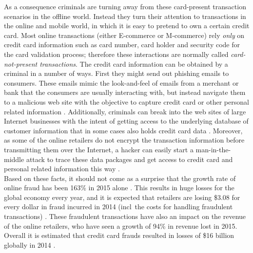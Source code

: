 As a consequence criminals are turning away from these card-present transaction scenarios in the offline world. Instead they turn their attention to transactions in the online and mobile world, in which it is easy to pretend to own a certain credit card. Most online transactions (either \gls{E-commerce} or \gls{M-commerce}) rely \emph{only} on credit card information such as card number, card holder and security code for the card validation process; therefore these interactions are normally called \emph{card-not-present transactions}. The credit card information can be obtained by a criminal in a number of ways. First they might send out phishing emails to consumers. These emails mimic the look-and-feel of emails from a merchant or bank that the consumers are usually interacting with, but instead navigate them to a malicious web site with the objective to capture credit card or other personal related information \citep{ConsumerAction2009}. Additionally, criminals can break into the web sites of large Internet businesses with the intent of getting access to the underlying database of customer information that in some cases also holds credit card data \citep{Holmes2015}. Moreover, as some of the online retailers do not encrypt the transaction information before transmitting them over the Internet, a hacker can easily start a man-in-the-middle attack to trace these data packages and get access to credit card and personal related information this way \citep{Captain2015}. \\

Based on these facts, it should not come as a surprise that the growth rate of online fraud has been 163\% in 2015 alone \citep{PYMNTS2016}. This results in huge losses for the global economy every year, and it is expected that retailers are losing \$3.08 for every dollar in fraud incurred in 2014 (\gls{incl}\ the costs for handling fraudulent transactions) \citep{Rampton2015}. These fraudulent transactions have also an impact on the revenue of the online retailers, who have seen a growth of 94\% in revenue lost in 2015. Overall it is estimated that credit card frauds resulted in losses of \$16 billion globally in 2014 \citep{PYMNTS2016} \citep{BusinessWire2015}. \\

